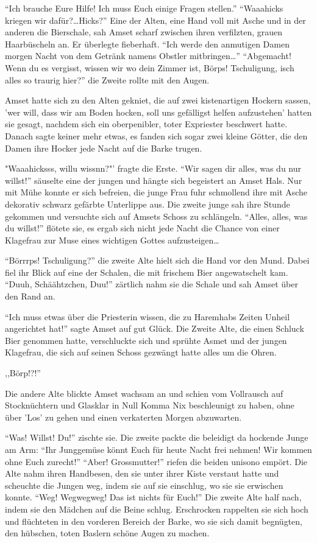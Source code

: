 \documentclass[11pt,titlepage,a5paper]{book}
\begin{document}
"`Ich brauche Eure Hilfe! Ich muss Euch einige Fragen stellen."' "`Waaahicks kriegen wir dafür?\dots Hicks?"' Eine der Alten, eine Hand voll mit Asche und in der anderen die Bierschale, sah Amset scharf zwischen ihren verfilzten, grauen Haarbüscheln an. Er überlegte fieberhaft. "`Ich werde den anmutigen Damen morgen Nacht von dem Getränk namens Obstler mitbringen\dots"' "`Abgemacht! Wenn du es vergisst, wissen wir wo dein Zimmer ist, Börps! Tschuligung, isch alles so traurig hier?"' die Zweite rollte mit den Augen. 

Amset hatte sich zu den Alten gekniet, die auf zwei kistenartigen Hockern sassen, 'wer will, dass wir am Boden hocken, soll uns gefälligst helfen aufzustehen' hatten sie gesagt, nachdem sich ein oberpenibler, toter Expriester beschwert hatte. Danach sagte keiner mehr etwas, es fanden sich sogar zwei kleine Götter, die den Damen ihre Hocker jede Nacht auf die Barke trugen.

"Waaahicksss, willu wissnn?"' fragte die Erste. "`Wir sagen dir alles, was du nur willst!"' säuselte eine der jungen und hängte sich begeistert an Amset Hals. Nur mit Mühe konnte er sich befreien, die junge Frau fuhr schmollend ihre mit Asche dekorativ schwarz gefärbte Unterlippe aus. Die zweite junge sah ihre Stunde gekommen und versuchte sich auf Amsets Schoss zu schlängeln. "`Alles, alles, was du willst!"' flötete sie, es ergab sich nicht jede Nacht die Chance von einer Klagefrau zur Muse eines wichtigen Gottes aufzusteigen\dots

"`Börrrps! Tschuligung?"' die zweite Alte hielt sich die Hand vor den Mund. Dabei fiel ihr Blick auf eine der Schalen, die mit frischem Bier angewatschelt kam. "`Duuh, Schäähtzchen, Duu!"' zärtlich nahm sie die Schale und sah Amset über den Rand an.

"`Ich muss etwas über die Priesterin wissen, die zu Haremhabs Zeiten Unheil angerichtet hat!"' sagte Amset auf gut Glück. Die Zweite Alte, die einen Schluck Bier genommen hatte, verschluckte sich und sprühte Asmet und der jungen Klagefrau, die sich auf seinen Schoss gezwängt hatte alles um die Ohren. \begin{LARGE},,Börp!?!''\end{LARGE} Die andere Alte blickte Amset wachsam an und schien vom Vollrausch auf Stocknüchtern und Glasklar in Null Komma Nix beschleunigt zu haben, ohne über 'Los' zu gehen und einen verkaterten Morgen abzuwarten. 

"`Was! Willst! Du!"' zischte sie. Die zweite packte die beleidigt da hockende Junge am Arm: "`Ihr Junggemüse könnt Euch für heute Nacht frei nehmen! Wir kommen ohne Euch zurecht!"' "`Aber! Grossmutter!"' riefen die beiden unisono empört. Die Alte nahm ihren Handbesen, den sie unter ihrer Kiste verstaut hatte und scheuchte die Jungen weg, indem sie auf sie einschlug, wo sie sie erwischen konnte. "`Weg! Wegwegweg! Das ist nichts für Euch!"' Die zweite Alte half nach, indem sie den Mädchen auf die Beine schlug. Erschrocken rappelten sie sich hoch und flüchteten in den vorderen Bereich der Barke, wo sie sich damit begnügten, den hübschen, toten Baslern schöne Augen zu machen.
\end{document}
